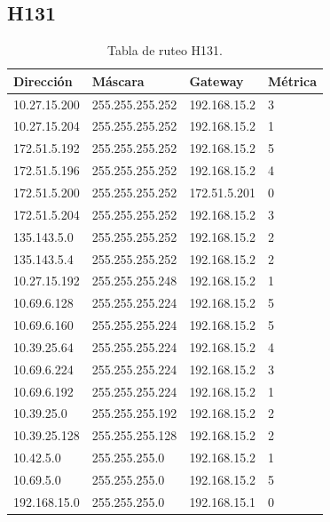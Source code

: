 \documentclass[12pt,titlepage]{article}
\begin{document}
\subsection{H131}
\begin{table}
  \begin{center}
    \begin{tabular}{|l|l|l|l|}
      \hline
        \bf{Direcci\'on} & \bf{M\'ascara} & \bf{Gateway} & \bf{M\'etrica} \\
      \hline 
	10.27.15.200  & 255.255.255.252 & 192.168.15.2 & 3 \\
        10.27.15.204  & 255.255.255.252 & 192.168.15.2 & 1 \\
        172.51.5.192  & 255.255.255.252 & 192.168.15.2 & 5 \\
        172.51.5.196  & 255.255.255.252 & 192.168.15.2 & 4 \\
        172.51.5.200  & 255.255.255.252 & 172.51.5.201 & 0 \\
        172.51.5.204  & 255.255.255.252 & 192.168.15.2 & 3 \\
        135.143.5.0   & 255.255.255.252 & 192.168.15.2 & 2 \\
        135.143.5.4   & 255.255.255.252 & 192.168.15.2 & 2 \\ 	
	10.27.15.192  & 255.255.255.248 & 192.168.15.2 & 1 \\
	10.69.6.128   & 255.255.255.224 & 192.168.15.2 & 5 \\
        10.69.6.160   & 255.255.255.224 & 192.168.15.2 & 5 \\
	10.39.25.64   & 255.255.255.224 & 192.168.15.2 & 4 \\       
	10.69.6.224   & 255.255.255.224 & 192.168.15.2 & 3 \\
	10.69.6.192   & 255.255.255.224 & 192.168.15.2 & 1 \\	
	10.39.25.0    & 255.255.255.192 & 192.168.15.2 & 2 \\
	10.39.25.128  & 255.255.255.128 & 192.168.15.2 & 2 \\
	10.42.5.0     & 255.255.255.0 & 192.168.15.2 & 1 \\
        10.69.5.0     & 255.255.255.0 & 192.168.15.2 & 5 \\
        192.168.15.0  & 255.255.255.0 & 192.168.15.1 & 0 \\  
    \hline
    \end{tabular} \\
  \end{center}
  \caption{Tabla de ruteo H131.}
\end{table}
\FloatBarrier
\end{document}

